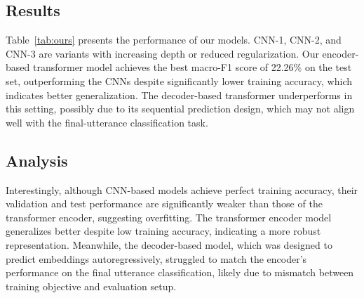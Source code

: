\documentclass{article}
\begin{document}
\subsection{Results}
Table~\ref{tab:ours} presents the performance of our models. CNN-1, CNN-2, and CNN-3 are variants with increasing depth or reduced regularization. Our encoder-based transformer model achieves the best macro-F1 score of 22.26\% on the test set, outperforming the CNNs despite significantly lower training accuracy, which indicates better generalization. The decoder-based transformer underperforms in this setting, possibly due to its sequential prediction design, which may not align well with the final-utterance classification task.

\begin{table}[h]
\centering
\caption{Performance metrics of our models on MELD.}
\label{tab:ours}
\end{table}

\subsection{Analysis}
Interestingly, although CNN-based models achieve perfect training accuracy, their validation and test performance are significantly weaker than those of the transformer encoder, suggesting overfitting. The transformer encoder model generalizes better despite low training accuracy, indicating a more robust representation. Meanwhile, the decoder-based model, which was designed to predict embeddings autoregressively, struggled to match the encoder’s performance on the final utterance classification, likely due to mismatch between training objective and evaluation setup.
\end{document}
